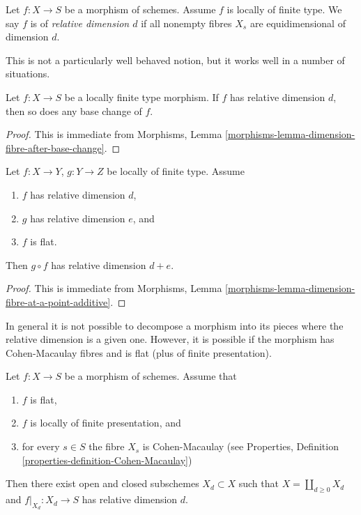 \begin{definition}
\label{definition-relative-dimension-d}
Let $f : X \to S$ be a morphism of schemes.
Assume $f$ is locally of finite type.
We say $f$ is of {\it relative dimension $d$} if
all nonempty fibres $X_s$ are equidimensional of dimension $d$.
\end{definition}

\noindent
This is not a particularly well behaved notion, but it works well
in a number of situations.

\begin{lemma}
\label{lemma-base-change-relative-dimension-d}
Let $f : X \to S$ be a locally finite type morphism.
If $f$ has relative dimension $d$, then so does any base
change of $f$.
\end{lemma}

\begin{proof}
This is immediate from
Morphisms, Lemma \ref{morphisms-lemma-dimension-fibre-after-base-change}.
\end{proof}

\begin{lemma}
\label{lemma-composition-relative-dimension-d}
Let $f : X \to Y$, $g : Y \to Z$ be locally of finite type.
Assume
\begin{enumerate}
\item $f$ has relative dimension $d$,
\item $g$ has relative dimension $e$, and
\item $f$ is flat.
\end{enumerate}
Then $g \circ f$ has relative dimension $d + e$.
\end{lemma}

\begin{proof}
This is immediate from
Morphisms, Lemma \ref{morphisms-lemma-dimension-fibre-at-a-point-additive}.
\end{proof}

\noindent
In general it is not possible to decompose a morphism
into its pieces where the relative dimension is a given
one. However, it is possible if the morphism has Cohen-Macaulay
fibres and is flat (plus of finite presentation).

\begin{lemma}
\label{lemma-flat-finite-presentation-CM-fibres-relative-dimension}
Let $f : X \to S$ be a morphism of schemes.
Assume that
\begin{enumerate}
\item $f$ is flat,
\item $f$ is locally of finite presentation, and
\item for every $s \in S$ the fibre $X_s$ is Cohen-Macaulay
(see Properties, Definition \ref{properties-definition-Cohen-Macaulay})
\end{enumerate}
Then there exist open and closed subschemes $X_d \subset X$
such that $X = \coprod_{d \geq 0} X_d$ and $f|_{X_d} : X_d \to S$
has relative dimension $d$.
\end{lemma}

